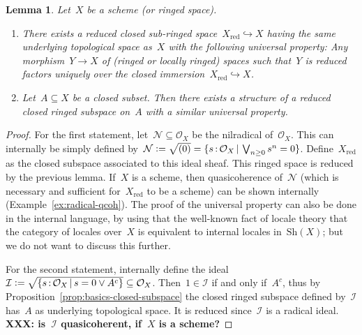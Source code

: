 \documentclass[10pt]{amsart}
\theoremstyle{definition}
\theoremstyle{plain}
\newtheorem{lemma}[defn]{Lemma}
\theoremstyle{remark}
\renewcommand{\O}{\mathcal{O}}
\newcommand{\N}{\mathcal{N}}
\newcommand{\I}{\mathcal{I}}
\newcommand{\Sh}{\mathrm{Sh}}
\newcommand{\?}{\,{:}\,}
\renewcommand{\_}{\mathpunct{.}\,}
\newcommand{\XXX}[1]{\textbf{XXX: #1}}
\newcommand{\defeq}{\vcentcolon=}
\begin{document}
\begin{lemma}\label{lemma:reduced-subspace}
Let~$X$ be a scheme (or ringed space).
\begin{enumerate}
\item There exists a reduced closed sub-ringed space~$X_\mathrm{red}
\hookrightarrow X$ having the same underlying topological space as~$X$ with
the following universal property: Any morphism~$Y \to X$
of (ringed or locally ringed) spaces such that~$Y$ is reduced factors uniquely
over the closed immersion~$X_\mathrm{red} \hookrightarrow X$.
\item Let~$A \subseteq X$ be a closed subset. Then there exists a structure of
a reduced closed ringed subspace on~$A$ with a similar universal
property.
\end{enumerate}
\end{lemma}
\begin{proof}For the first statement, let~$\N \subseteq \O_X$ be the nilradical
of~$\O_X$. This can internally be simply defined by~$\N \defeq \sqrt{(0)} = \{
s\?\O_X \,|\, \bigvee_{n \geq 0} s^n = 0 \}$. Define~$X_\mathrm{red}$ as the closed
subspace associated to this ideal sheaf. This ringed space is reduced by the
previous lemma. If~$X$ is a scheme, then quasicoherence of~$\N$ (which is
necessary and sufficient for~$X_\mathrm{red}$ to be a scheme) can be shown
internally (Example~\ref{ex:radical-qcoh}).
The proof of the universal property can also be done in the
internal language, by using that the well-known fact of locale theory that the
category of locales over~$X$ is equivalent to internal locales in~$\Sh(X)$; but
we do not want to discuss this further.

For the second statement, internally define the ideal~$\I \defeq \sqrt{\{ s\?\O_X \,|\, s = 0 \vee
A^c \}} \subseteq \O_X$. Then~$1 \in \I$ if and only if~$A^c$, thus by
Proposition~\ref{prop:basics-closed-subspace} the closed ringed subspace defined
by~$\I$ has~$A$ as underlying topological space. It is reduced since~$\I$ is a
radical ideal. \XXX{is~$\I$ quasicoherent, if~$X$ is a scheme?}\end{proof}
\end{document}
